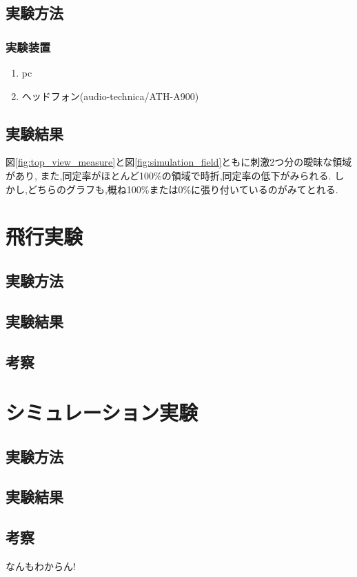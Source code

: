 \documentclass[upLatex]{jsreport}
\begin{document}
\section{実験方法}
  \subsection{実験装置}
  \begin{enumerate}
    \item pc
    \item ヘッドフォン(audio-technica/ATH-A900)
  \end{enumerate}

\newpage
\section{実験結果}
  図\ref{fig:top_view_measure}と図\ref{fig:simulation_field}ともに刺激2つ分の曖昧な領域があり,
  また,同定率がほとんど100\%の領域で時折,同定率の低下がみられる.
  しかし,どちらのグラフも,概ね100\%または0\%に張り付いているのがみてとれる.

\newpage
\chapter{飛行実験}
\section{実験方法}
\section{実験結果}
\section{考察}

\newpage
\chapter{シミュレーション実験}
\section{実験方法}
\section{実験結果}
\section{考察}
なんもわからん!
\end{document}
